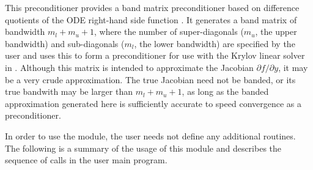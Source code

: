 This preconditioner provides a band matrix preconditioner based on
difference quotients of the ODE right-hand side function .
It generates a band matrix of bandwidth $m_l + m_u + 1$, where
the number of super-diagonals ($m_u$, the upper bandwidth) and
sub-diagonals ($m_l$, the lower bandwidth) are specified by
the user and uses this to form a preconditioner for use with the Krylov
linear solver in {\cvspgmr}.  Although this matrix is intended
to approximate the Jacobian $\partial f / \partial y$, 
it may be a very crude approximation.  The true Jacobian need not be banded, or its
true bandwith may be larger than $m_l + m_u + 1$, as long as the
banded approximation generated here is sufficiently accurate
to speed convergence as a preconditioner. 

In order to use the {\cvbandpre} module, the user needs not define any
additional routines. The following is a summary of the usage of this 
module and describes the sequence of calls in the user main program.
